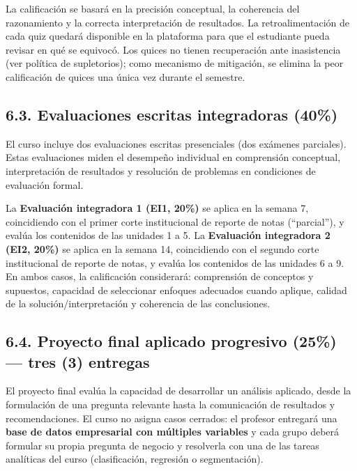 \documentclass[11pt,a4paper]{article}
\begin{document}
\vspace{0.3cm}

La calificación se basará en la precisión conceptual, la coherencia del razonamiento y la correcta interpretación de resultados. La retroalimentación de cada quiz quedará disponible en la plataforma para que el estudiante pueda revisar en qué se equivocó. Los quices no tienen recuperación ante inasistencia (ver política de supletorios); como mecanismo de mitigación, se elimina la peor calificación de quices una única vez durante el semestre.

\subsection*{6.3. Evaluaciones escritas integradoras (40\%)}

El curso incluye dos evaluaciones escritas presenciales (dos exámenes parciales). Estas evaluaciones miden el desempeño individual en comprensión conceptual, interpretación de resultados y resolución de problemas en condiciones de evaluación formal.

\vspace{0.3cm}

La \textbf{Evaluación integradora 1 (EI1, 20\%)} se aplica en la semana 7, coincidiendo con el primer corte institucional de reporte de notas (``parcial''), y evalúa los contenidos de las unidades 1 a 5. La \textbf{Evaluación integradora 2 (EI2, 20\%)} se aplica en la semana 14, coincidiendo con el segundo corte institucional de reporte de notas, y evalúa los contenidos de las unidades 6 a 9. En ambos casos, la calificación considerará: comprensión de conceptos y supuestos, capacidad de seleccionar enfoques adecuados cuando aplique, calidad de la solución/interpretación y coherencia de las conclusiones.

\subsection*{6.4. Proyecto final aplicado progresivo (25\%) --- tres (3) entregas}

El proyecto final evalúa la capacidad de desarrollar un análisis aplicado, desde la formulación de una pregunta relevante hasta la comunicación de resultados y recomendaciones. El curso no asigna casos cerrados: el profesor entregará una \textbf{base de datos empresarial con múltiples variables} y cada grupo deberá formular su propia pregunta de negocio y resolverla con una de las tareas analíticas del curso (clasificación, regresión o segmentación).
\end{document}
